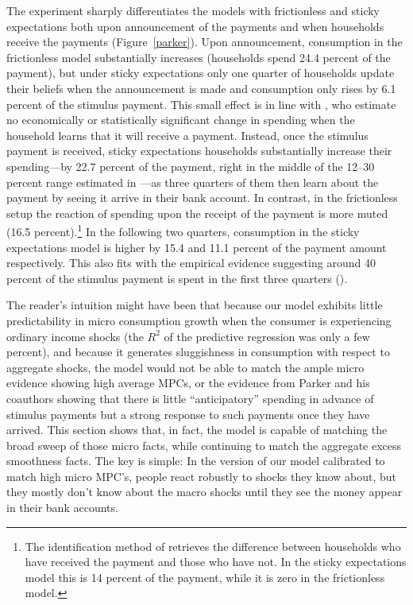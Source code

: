   The experiment sharply differentiates the models with frictionless and sticky expectations both upon announcement of the payments and when households receive the payments (Figure~\ref{parker}). Upon announcement, consumption in the frictionless model substantially increases (households spend 24.4 percent of the payment), but under sticky expectations only one quarter of households update their beliefs when the announcement is made and consumption only rises by 6.1 percent of the stimulus payment.  This small effect is in line with \cite{brodaParker}, who estimate no economically or statistically significant change in spending when the household learns that it will receive a payment.  Instead, once the stimulus payment is received, sticky expectations households substantially increase their spending---by 22.7 percent of the payment, right in the middle of the 12--30 percent range estimated in \cite{psjmMPC2008}---as three quarters of them then learn about the payment by seeing it arrive in their bank account. In contrast, in the frictionless setup the reaction of spending upon the receipt of the payment is more muted (16.5 percent).\footnote{The identification method of \cite{psjmMPC2008} retrieves the difference between households who have received the payment and those who have not. In the sticky expectations model this is 14 percent of the payment, while it is zero in the frictionless model.} In the following two quarters, consumption in the sticky expectations model is higher by 15.4 and 11.1 percent of the payment amount respectively. This also fits with the empirical evidence suggesting around 40 percent of the stimulus payment is spent in the first three quarters (\cite{psjmMPC2008}).

  The reader's intuition might have been that because our model exhibits little predictability in micro consumption growth when the consumer is experiencing ordinary income shocks (the $R^{2}$ of the predictive regression was only a few percent), and because it generates sluggishness in consumption with respect to aggregate shocks, the model would not be able to match the ample micro evidence showing high average MPCs, or the evidence from Parker and his coauthors showing that there is little ``anticipatory'' spending in advance of stimulus payments but a strong response to such payments once they have arrived.  This section shows that, in fact, the model is capable of matching the broad sweep of those micro facts, while continuing to match the aggregate excess smoothness facts.  The key is simple: In the version of our model calibrated to match high micro MPC's, people react robustly to shocks they know about, but they mostly don't know about the macro shocks until they see the money appear in their bank accounts.

